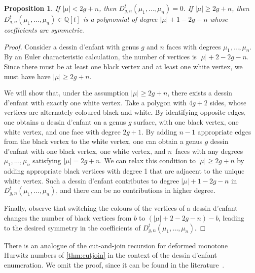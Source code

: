 \documentclass[a4paper]{article}
\theoremstyle{plain}
\newtheorem{proposition}[theorem]{Proposition}
\numberwithin{theorem}{section}
\theoremstyle{definition}
\theoremstyle{remark}
\renewcommand{\geq}{\geqslant}
\begin{document}
\begin{proposition}
If $|\mu| < 2g + n$, then $D_{g,n}^t(\mu_1, \ldots, \mu_n) = 0$. If $|\mu| \geq 2g + n$, then $D_{g,n}^t(\mu_1, \ldots, \mu_n) \in \mathbb{Q}[t]$ is a polynomial of degree $|\mu| + 1 - 2g - n$ whose coefficients are symmetric.
\end{proposition}


\begin{proof}
Consider a dessin d'enfant with genus $g$ and $n$ faces with degrees $\mu_1, \ldots, \mu_n$. By an Euler characteristic calculation, the number of vertices is $|\mu| + 2 - 2g - n$. Since there must be at least one black vertex and at least one white vertex, we must have have $|\mu| \geq 2g + n$.


We will show that, under the assumption $|\mu| \geq 2g + n$, there exists a dessin d'enfant with exactly one white vertex. Take a polygon with $4g+2$ sides, whose vertices are alternately coloured black and white. By identifying opposite edges, one obtains a dessin d'enfant on a genus $g$ surface, with one black vertex, one white vertex, and one face with degree $2g+1$. By adding $n-1$ appropriate edges from the black vertex to the white vertex, one can obtain a genus $g$ dessin d'enfant with one black vertex, one white vertex, and $n$~faces with any degrees $\mu_1, \ldots, \mu_n$ satisfying $|\mu| = 2g + n$. We can relax this condition to $|\mu| \geq 2g + n$ by adding appropriate black vertices with degree 1 that are adjacent to the unique white vertex. Such a dessin d'enfant contributes to degree $|\mu| + 1 - 2g - n$ in $D_{g,n}^t(\mu_1, \ldots, \mu_n)$, and there can be no contributions in higher degree.


Finally, observe that switching the colours of the vertices of a dessin d'enfant changes the number of black vertices from $b$ to $(|\mu| + 2 - 2g - n) - b$, leading to the desired symmetry in the coefficients of $D_{g,n}^t(\mu_1, \ldots, \mu_n)$.
\end{proof}


There is an analogue of the cut-and-join recursion for deformed monotone Hurwitz numbers of \cref{thm:cutjoin} in the context of the dessin d'enfant enumeration. We omit the proof, since it can be found in the literature~\cite{kaz-zog15}.
\end{document}
